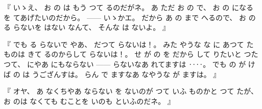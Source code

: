 %
『
いゝえ、
%
お
の
は
もう
つて
るのだがネ。
%
あ
ただ%
お
の
で、
%
お
の
になる
を
てあげたいのだから。
%
{---}{---}%
いゝかエ。
%
だから
あ
の
まで
へるので、
%
お
の
る
らないを
はない
なんて、
%
そんな
は
ないよ。
』

%
『
でも
る
らないで
やあ、
%
だつて
らないは！。
%
みた
やうな
な
に
あつて
た
ものは
きて
るのからして
らないは！。
%
せ
が
の
を
だから
して
りたいと
%
つたつて、
%
にやあ%
にもならない%
{---}{---}%
らないなあ
れてますは%
‥‥。
%
でも
の
が
けば%
の
は
うござんすは。
%
らん
で
ますなあ
なやうな
が
ますは。
』

%
『
オヤ、
%
あ
なくちやあ
ならない
を
ないのが
つて
いふ
ものかと
つて
たが、
%
お
のは
なくても
むことを
いのも
といふのだネ。
』

